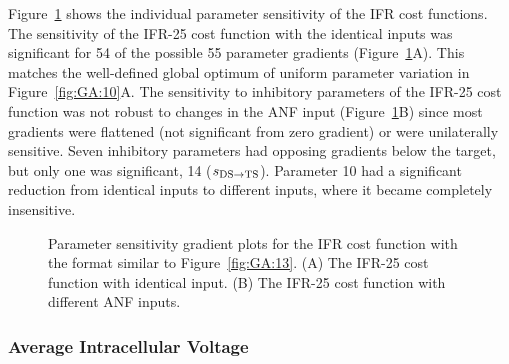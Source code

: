 Figure~\ref{fig:GA:14} shows the individual parameter sensitivity of the
IFR cost functions.  The sensitivity of the IFR-25 cost function with
the identical inputs was significant for 54 of the possible 55
parameter gradients (Figure~\ref{fig:GA:14}A).  This matches the
well-defined global optimum of uniform parameter variation in
Figure~\ref{fig:GA:10}A.  The sensitivity to inhibitory parameters of the
IFR-25 cost function was not robust to changes in the ANF input
(Figure~\ref{fig:GA:14}B) since most gradients were flattened (not
significant from zero gradient) or were unilaterally sensitive.  Seven
inhibitory parameters had opposing gradients below the target, but
only one was significant, 14 ($s_{{\rm DS}\to {\rm TS}} $). Parameter
10 had a significant reduction from identical inputs to different
inputs, where it became completely insensitive. %



\begin{figure}[th]
  \centering
 \caption{Parameter sensitivity gradient plots for the IFR cost function
    with the format similar to Figure~\ref{fig:GA:13}. (A) The IFR-25 cost
    function with identical input. (B) The IFR-25 cost function with
    different ANF inputs. %
}
  \label{fig:GA:14}
\end{figure}


\subsubsection{Average Intracellular Voltage}

